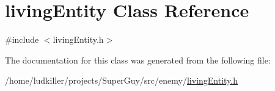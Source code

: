 \hypertarget{classliving_entity}{\section{living\-Entity Class Reference}
\label{classliving_entity}
}


{\ttfamily \#include $<$living\-Entity.\-h$>$}



The documentation for this class was generated from the following file\-:\begin{DoxyCompactItemize}
\item 
/home/ludkiller/projects/\-Super\-Guy/src/enemy/\hyperlink{living_entity_8h}{living\-Entity.\-h}\end{DoxyCompactItemize}
